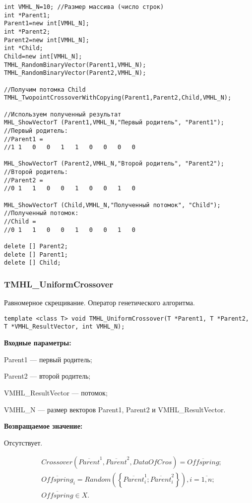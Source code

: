 \documentclass[a4paper,12pt]{article}
\begin{document}
\begin{lstlisting}[label=code_use_TMHL_TwopointCrossoverWithCopying,caption=Пример использования]
int VMHL_N=10; //Размер массива (число строк)
int *Parent1;
Parent1=new int[VMHL_N];
int *Parent2;
Parent2=new int[VMHL_N];
int *Child;
Child=new int[VMHL_N];
TMHL_RandomBinaryVector(Parent1,VMHL_N);
TMHL_RandomBinaryVector(Parent2,VMHL_N);

//Получим потомка Child
TMHL_TwopointCrossoverWithCopying(Parent1,Parent2,Child,VMHL_N);

//Используем полученный результат
MHL_ShowVectorT (Parent1,VMHL_N,"Первый родитель", "Parent1");
//Первый родитель:
//Parent1 =
//1	1	0	0	1	1	0	0	0	0

MHL_ShowVectorT (Parent2,VMHL_N,"Второй родитель", "Parent2");
//Второй родитель:
//Parent2 =
//0	1	1	0	0	1	0	0	1	0

MHL_ShowVectorT (Child,VMHL_N,"Полученный потомок", "Child");
//Полученный потомок:
//Child =
//0	1	1	0	0	1	0	0	1	0

delete [] Parent2;
delete [] Parent1;
delete [] Child;
\end{lstlisting}

\subsubsection{TMHL\_UniformCrossover}\label{TMHL_UniformCrossover}

Равномерное скрещивание. Оператор генетического алгоритма.


\begin{lstlisting}[label=code_syntax_TMHL_UniformCrossover,caption=Синтаксис]
template <class T> void TMHL_UniformCrossover(T *Parent1, T *Parent2, T *VMHL_ResultVector, int VMHL_N);
\end{lstlisting}

\textbf{Входные параметры:}
 
 Parent1 --- первый родитель;
 
 Parent2 --- второй родитель;
 
 VMHL\_ResultVector --- потомок;
 
 VMHL\_N --- размер векторов Parent1, Parent2 и VMHL\_ResultVector.

\textbf{Возвращаемое значение:}

 Отсутствует.
 
\begin{align*}
&Crossover \left( \overline{Parent}^1, \overline{Parent}^2, DataOfCros\right) = \overline{Offspring};\\
& \overline{Offspring}_i=Random\left( \left\lbrace \overline{Parent}^1_i;\overline{Parent}^2_i\right\rbrace \right), i=\overline{1,n} ;\nonumber\\
&\overline{Offspring}\in X.\nonumber
\end{align*}
\end{document}
